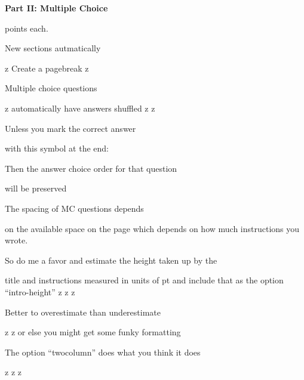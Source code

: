 \documentclass{exam}
\begin{document}
\newpage
\par\noindent \textbf{\large  Part II: Multiple Choice}
\par{} points each.
\setlength{\columnsep}{0.40 in}
\begin{multicols*}{2}
\renewcommand{\choiceshook}{\setlength{\leftmargin}{0.40 in}}
\renewcommand{\questionshook}{\setlength{\leftmargin}{0.0 in}}
\begin{questions}
\setcounter{question}{12}
	\question New sections autmatically
	\begin{choices}
		\choice z
		\CorrectChoice Create a pagebreak
		\choice z
	\end{choices}
	\question Multiple choice questions
	\begin{choices}
		\choice z
		\CorrectChoice automatically have answers shuffled
		\choice z
		\choice z
	\end{choices}
	\question Unless you mark the correct answer
	\begin{choices}
		\CorrectChoice with this symbol at the end:
		\choice 1
		\choice 2
		\choice 3
	\end{choices}
	\question Then the answer choice order for that question
	\begin{choices}
		\choice will
		\choice be
		\CorrectChoice preserved
	\end{choices}
	\question The spacing of MC questions depends
	\begin{choices}
		\choice on the available space on the page
		\CorrectChoice which depends on how much instructions you wrote.
	\end{choices}
	\question So do me a favor and estimate the height taken up by the
	\begin{choices}
		\choice title and instructions
		\CorrectChoice measured in units of pt
		\choice and include that as the option ``intro-height''
		\choice z
		\choice z
		\choice z
	\end{choices}
	\question Better to overestimate than underestimate
	\begin{choices}
		\choice z
		\choice z
		\CorrectChoice or else you might get some funky formatting
	\end{choices}
	\vfill\null\columnbreak
	\question The option ``twocolumn'' does what you think it does
	\begin{choices}
		\CorrectChoice z
		\CorrectChoice z
		\CorrectChoice z
	\end{choices}
\end{questions}
\end{multicols*}
\renewcommand{\choiceshook}{}
\renewcommand{\questionshook}{}
\end{document}
